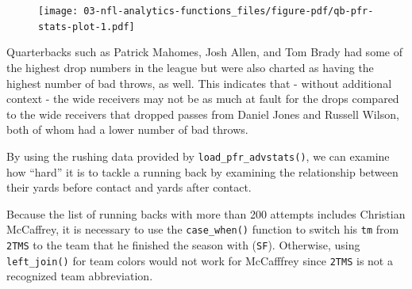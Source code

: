 \documentclass[
  letterpaper,
]{krantz}
\begin{document}
\begin{figure}[H]

{\centering \texttt{[image: 03-nfl-analytics-functions\_files/figure-pdf/qb-pfr-stats-plot-1.pdf]}

}

\end{figure}

Quarterbacks such as Patrick Mahomes, Josh Allen, and Tom Brady had some
of the highest drop numbers in the league but were also charted as
having the highest number of bad throws, as well. This indicates that -
without additional context - the wide receivers may not be as much at
fault for the drops compared to the wide receivers that dropped passes
from Daniel Jones and Russell Wilson, both of whom had a lower number of
bad throws.

By using the rushing data provided by \texttt{load\_pfr\_advstats()}, we
can examine how ``hard'' it is to tackle a running back by examining the
relationship between their yards before contact and yards after contact.

\begin{tcolorbox}[enhanced jigsaw, left=2mm, toprule=.15mm, opacitybacktitle=0.6, leftrule=.75mm, bottomrule=.15mm, colbacktitle=quarto-callout-important-color!10!white, breakable, colback=white, bottomtitle=1mm, toptitle=1mm, title=\textcolor{quarto-callout-important-color}{\faExclamation}\hspace{0.5em}{Important}, coltitle=black, titlerule=0mm, arc=.35mm, opacityback=0, colframe=quarto-callout-important-color-frame, rightrule=.15mm]

Because the list of running backs with more than 200 attempts includes
Christian McCaffrey, it is necessary to use the \texttt{case\_when()}
function to switch his \texttt{tm} from \texttt{2TMS} to the team that
he finished the season with (\texttt{SF}). Otherwise, using
\texttt{left\_join()} for team colors would not work for McCafffrey
since \texttt{2TMS} is not a recognized team abbreviation.

\end{tcolorbox}
\end{document}
